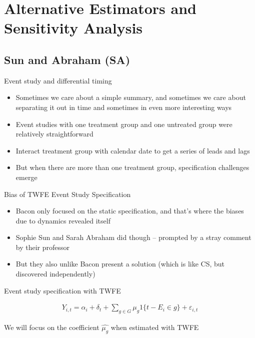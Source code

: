 \documentclass{beamer}
\begin{document}
\section{Alternative Estimators and Sensitivity Analysis}

\subsection{Sun and Abraham (SA)}




\begin{frame}{Event study and differential timing}

\begin{itemize}
\item Sometimes we care about a simple summary, and sometimes we care about separating it out in time and sometimes in even more interesting ways
\item Event studies with one treatment group and one untreated group were relatively straightforward
\item Interact treatment group with calendar date to get a series of leads and lags
\item But when there are more than one treatment group, specification challenges emerge
\end{itemize}

\end{frame}





\begin{frame}{Bias of TWFE Event Study Specification}

\begin{itemize}
\item Bacon only focused on the static specification, and that's where the biases due to dynamics revealed itself
\item Sophie Sun and Sarah Abraham did though -- prompted by a stray comment by their professor
\item But they also unlike Bacon present a solution (which is like CS, but discovered independently)
\end{itemize}

\end{frame}

\begin{frame}{Event study specification with TWFE}


\begin{eqnarray*}
Y_{i,t} = \alpha_i + \delta_t + \sum_{g \in G} \mu_g1\{t-E_i \in g \} + \varepsilon_{i,t}
\end{eqnarray*}

\bigskip

We will focus on the coefficient $\widehat{\mu_g}$ when estimated with TWFE

\end{frame}
\end{document}
